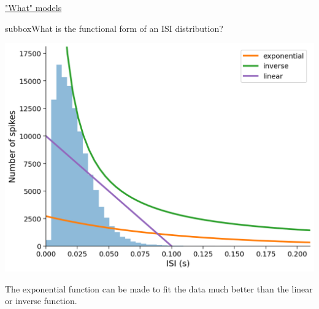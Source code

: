 \begin{textbox}{\href{https://compneuro.neuromatch.io/tutorials/W1D1_ModelTypes/student/W1D1_Tutorial1.html}{"What" models }   }
\begin{subbox}{subbox}{What is the functional form of an ISI distribution?}
\begin{center}
\includegraphics[scale=0.15]{Figures/MT/MT_Figure4.png}
\end{center}
The exponential function can be made to fit the data much better than the linear
or inverse function.
\end{subbox}
\end{textbox}
